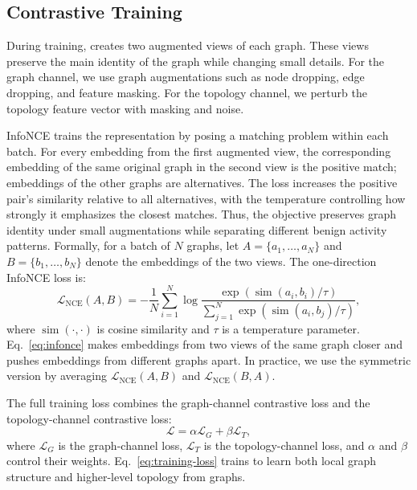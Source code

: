 \subsection{Contrastive Training}

During training, \sysname{} creates two augmented views of each graph. These views preserve the main identity of the graph while changing small details. For the graph channel, we use graph augmentations such as node dropping, edge dropping, and feature masking. For the topology channel, we perturb the topology feature vector with masking and noise.

InfoNCE trains the representation by posing a matching problem within each batch. For every embedding from the first augmented view, the corresponding embedding of the same original graph in the second view is the positive match; embeddings of the other graphs are alternatives. The loss increases the positive pair's similarity relative to all alternatives, with the temperature controlling how strongly it emphasizes the closest matches. Thus, the objective preserves graph identity under small augmentations while separating different benign activity patterns. Formally, for a batch of $N$ graphs, let $A=\{a_1,\ldots,a_N\}$ and $B=\{b_1,\ldots,b_N\}$ denote the embeddings of the two views. The one-direction InfoNCE loss is:
\begin{equation}
    \mathcal{L}_{\text{NCE}}(A,B)
    =
    -\frac{1}{N}
    \sum_{i=1}^{N}
    \log
    \frac{
        \exp(\operatorname{sim}(a_i,b_i)/\tau)
    }{
        \sum_{j=1}^{N}
        \exp(\operatorname{sim}(a_i,b_j)/\tau)
    },
    \label{eq:infonce}
\end{equation}
where $\operatorname{sim}(\cdot,\cdot)$ is cosine similarity and $\tau$ is a temperature parameter. Eq.~\eqref{eq:infonce} makes embeddings from two views of the same graph closer and pushes embeddings from different graphs apart. In practice, we use the symmetric version by averaging $\mathcal{L}_{\text{NCE}}(A,B)$ and $\mathcal{L}_{\text{NCE}}(B,A)$.

The full training loss combines the graph-channel contrastive loss and the topology-channel contrastive loss:
\begin{equation}
    \mathcal{L}
    =
    \alpha \mathcal{L}_{G}
    +
    \beta \mathcal{L}_{T},
    \label{eq:training-loss}
\end{equation}
where $\mathcal{L}_{G}$ is the graph-channel loss, $\mathcal{L}_{T}$ is the topology-channel loss, and $\alpha$ and $\beta$ control their weights. Eq.~\eqref{eq:training-loss} trains \sysname{} to learn both local graph structure and higher-level topology from graphs.

